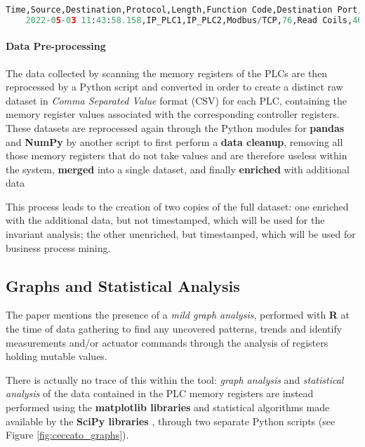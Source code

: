 \bigskip
\begin{lstlisting}[language=Python, numbers=none, caption=Example of raw network capture, label=lst:raw_network_capture]	
	Time,Source,Destination,Protocol,Length,Function Code,Destination Port,Source Port,Data,Frame length on the wire,Bit Value,Request Frame,Reference Number,Info
	2022-05-03 11:43:58.158,IP_PLC1,IP_PLC2,Modbus/TCP,76,Read Coils,46106,502,,76,TRUE,25,,"Response: Trans: 62; Unit: 1, Func: 1: Read Coils"
\end{lstlisting}

\paragraph{Data Pre-processing} 
The data collected by scanning the memory registers of the PLCs are then reprocessed by a Python script and converted in order to create a distinct raw dataset in \textit{Comma Separated Value} format (CSV) for each PLC, containing the memory register values associated with the corresponding controller registers. These datasets are reprocessed again through the Python modules for \textbf{pandas} \cite{pandas} and \textbf{NumPy} \cite{numpy} by another script to first perform a \textbf{data cleanup}, removing all those memory registers that do not take values and are therefore useless within the system, \textbf{merged} into a single dataset, and finally \textbf{enriched} with additional data %

\bigskip
This process leads to the creation of two copies of the full dataset: one enriched with the additional data, but not timestamped, which will be used for the invariant analysis; the other unenriched, but timestamped, which will be used for business process mining.

\vfill
\subsection{Graphs and Statistical Analysis}
\label{subsec:ceccato_graphanalysis}
The paper mentions the presence of a \textit{mild graph analysis}, performed with \textbf{R} \cite{r-project} at the time of data gathering to find any uncovered patterns, trends and identify measurements and/or actuator commands through the analysis of registers holding mutable values. 

\bigskip
There is actually no trace of this within the tool: \textit{graph analysis} and \textit{statistical analysis} of the data contained in the PLC memory registers are instead performed using the \textbf{matplotlib libraries} and statistical algorithms made available by the \textbf{SciPy libraries} \cite{scipy}, through two separate Python scripts (see Figure \ref{fig:ceccato_graphs}).

